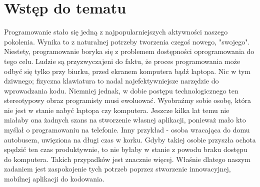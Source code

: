 \chapter{Wstęp do tematu}

Programowanie stało się jedną z najpopularniejszych aktywności naszego pokolenia. Wynika to z naturalnej potrzeby tworzenia czegoś nowego, "swojego". Niestety, programowanie boryka się z problemem dostępności oprogramowania do tego celu. Ludzie są przyzwyczajeni do faktu, że proces programowania może odbyć się tylko przy biurku, przed ekranem komputera bądź laptopa. Nic w tym dziwnego; fizyczna klawiatura to nadal najefektywniejsze narzędzie do wprowadzania kodu. Niemniej jednak, w dobie postępu technologicznego ten stereotypowy obraz programisty musi ewoluować.
\newline\newline
Wyobraźmy sobie osobę, która nie jest w stanie nabyć laptopa czy komputera. Jeszcze kilka lat temu nie miałaby ona żadnych szans na stworzenie własnej aplikacji, ponieważ mało kto myślał o programowaniu na telefonie. Inny przykład - osoba wracająca do domu autobusem, uwięziona na długi czas w korku. Gdyby takiej osobie przyszła ochota spędzić ten czas produktywnie, to nie byłaby w stanie z powodu braku dostępu do komputera. 
\newline\newline
Takich przypadków jest znacznie więcej. Właśnie dlatego naszym zadaniem jest zaspokojenie tych potrzeb poprzez stworzenie innowacyjnej, mobilnej aplikacji do kodowania.
